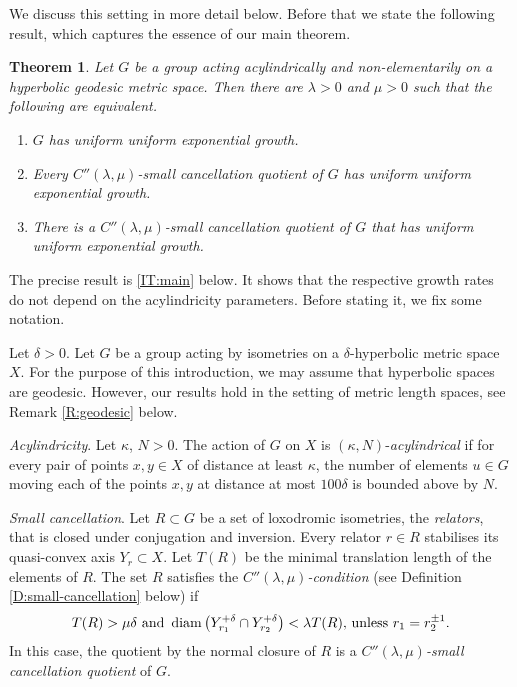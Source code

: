 \documentclass[leqno,a4paper,10pt]{amsart}
\theoremstyle{plain}
\newtheorem{thm}{Theorem}[section]
\theoremstyle{definition}
\theoremstyle{remark}
\DeclareMathOperator{\diam}{diam}
\begin{document}
 We discuss this setting in more detail below. Before that we state the following result, which captures the essence of our main theorem.
\begin{thm}\label{IT:essence}
	Let $G$ be a group acting acylindrically and non-elementarily on a hyperbolic geodesic metric space. %
	Then there are $\lambda>0$ and $\mu>0$ such that the following are equivalent.
	\begin{enumerate}[label=(\roman*)]
		\item $G$ has uniform uniform exponential growth.
		\item Every $C''(\lambda,\mu)$-small cancellation quotient of $G$ has uniform uniform exponential growth.
		\item There is a $C''(\lambda,\mu)$-small cancellation quotient of $G$ that has uniform uniform exponential growth.
	\end{enumerate}
\end{thm}
The precise result is \autoref{IT:main} below. It shows that the respective growth rates do not depend on the acylindricity parameters. Before stating it, we fix some notation.

 Let $\delta>0$. Let $G$ be a group acting by isometries on a $\delta$-hyperbolic metric space $X$. For the purpose of this introduction, we may assume that hyperbolic spaces are geodesic. However, our results hold in the setting of metric length spaces, see Remark \ref{R:geodesic} below.  
 
\textit{Acylindricity}. Let $\kappa$, $N>0$. The action of $G$ on $X$ is $(\kappa,N)$-\emph{acylindrical} if for every pair of points $x, y \in X$ of distance at least $\kappa$, the number of elements $u \in G$ moving each of the points $x,y$ at distance at most $100\delta$ is bounded above by $N$.

\textit{Small cancellation}. Let ${R}\subset G$ be a set of loxodromic isometries, the \emph{relators}, that is closed under conjugation and inversion. Every relator $r\in R$ stabilises its quasi-convex axis $Y_r\subset X$. Let ${T}({R})$ be the minimal translation length of the elements of ${R}$. The set ${R}$ satisfies the \emph{$C''(\lambda,\mu)$-condition} (see Definition \ref{D:small-cancellation} below) if
\begin{align*}
{T}({R})>\mu\delta \hbox{ and } \diam\left(Y_{r_1}^{+\delta}\cap Y_{r_2}^{+\delta}\right)< \lambda {T}({R})\hbox{, unless $r_1=r_2^{\pm 1}$}.
\end{align*}
 In this case, the quotient by the normal closure of ${R}$ is a \emph{$C''(\lambda,\mu)$-small cancellation quotient} of $G$.
 
\end{document}
